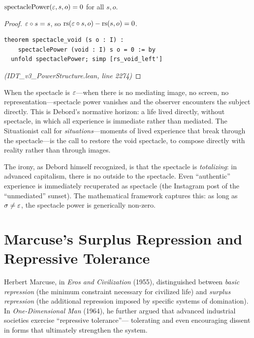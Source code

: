 \begin{theorem}
\label{thm:spectacle-void}
$\mathrm{spectaclePower}(\varepsilon, s, o) = 0$ for all $s, o$.
\end{theorem}

\begin{proof}
$\varepsilon \circ s = s$, so $\mathrm{rs}(\varepsilon \circ s, o) - \mathrm{rs}(s, o) = 0$.
\begin{lstlisting}
theorem spectacle_void (s o : I) :
    spectaclePower (void : I) s o = 0 := by
  unfold spectaclePower; simp [rs_void_left']
\end{lstlisting}
\textit{(IDT\_v3\_PowerStructure.lean, line 2274)}
\end{proof}

\begin{interpretation}
When the spectacle is $\varepsilon$---when there is no mediating image, no
screen, no representation---spectacle power vanishes and the observer
encounters the subject directly. This is Debord's normative horizon:
a life lived directly, without spectacle, in which all experience is
immediate rather than mediated. The Situationist call for
\emph{situations}---moments of lived experience that break through the
spectacle---is the call to restore the void spectacle, to compose
directly with reality rather than through images.

The irony, as Debord himself recognized, is that the spectacle is
\emph{totalizing}: in advanced capitalism, there is no outside to the
spectacle. Even ``authentic'' experience is immediately recuperated as
spectacle (the Instagram post of the ``unmediated'' sunset). The mathematical
framework captures this: as long as $\sigma \neq \varepsilon$, the spectacle
power is generically non-zero.
\end{interpretation}

\section{Marcuse's Surplus Repression and Repressive Tolerance}

Herbert Marcuse, in \emph{Eros and Civilization} (1955), distinguished between
\emph{basic repression} (the minimum constraint necessary for civilized life)
and \emph{surplus repression} (the additional repression imposed by specific
systems of domination). In \emph{One-Dimensional Man} (1964), he further
argued that advanced industrial societies exercise ``repressive tolerance''---
tolerating and even encouraging dissent in forms that ultimately strengthen
the system.

